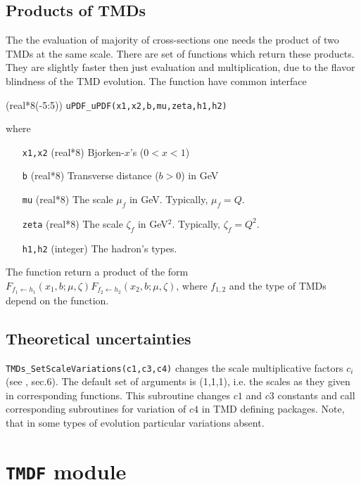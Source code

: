 \documentclass[prd,nofootinbib,eqsecnum,final]{revtex4}
\newcommand{\ot}{\leftarrow}
\renewcommand{\(}{\left(}
\renewcommand{\)}{\right)}
\renewcommand{\[}{\left[}
\renewcommand{\]}{\right]}
\begin{document}
\subsection{Products of TMDs}
\label{TMDs:products}

The the evaluation of majority of cross-sections one needs the product of two TMDs at the same scale. There are set of functions which return these products. They are slightly faster then just evaluation and multiplication, due to the flavor blindness of the TMD evolution. The function have common interface

(real*8(-5:5)) \texttt{uPDF{\_}uPDF(x1,x2,b,mu,zeta,h1,h2)}

where
\begin{itemize}
\item [\texttt{x1,x2}] (real*8) Bjorken-$x$'s ($0<x<1$)
\item [\texttt{b}] (real*8) Transverse distance ($b>0$) in GeV
\item [\texttt{mu}] (real*8) The scale $\mu_f$ in GeV. Typically, $\mu_f=Q$.
\item [\texttt{zeta}] (real*8) The scale $\zeta_f$ in GeV$^2$. Typically, $\zeta_f=Q^2$.
\item [\texttt{h1,h2}] (integer) The hadron's types.
\end{itemize}
The function return a product of the form $F_{f_1\ot h_1}(x_1,b;\mu,\zeta)F_{f_2\ot h_2}(x_2,b;\mu,\zeta)$, where $f_{1,2}$ and the type of TMDs depend on the function.



\subsection{Theoretical uncertainties}
\label{TMDs:c123}

\texttt{TMDs\_SetScaleVariations(c1,c3,c4)} changes the scale multiplicative factors $c_i$ (see \cite{Scimemi:2018xaf}, sec.6). The default set of arguments is (1,1,1), i.e. the scales as they given in corresponding functions. This subroutine changes $c1$ and $c3$ constants and call corresponding subroutines for variation of $c4$ in TMD defining packages. Note, that in some types of evolution particular variations absent.

\newpage

\section{\texttt{TMDF} module}
\label{TMDF}
\end{document}
